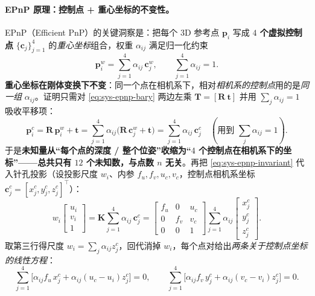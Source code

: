 \paragraph{EPnP 原理：控制点 + 重心坐标的不变性。}
EPnP（Efficient PnP）的关键洞察是：把每个 3D 参考点 $\mathbf{p}_i$ 写成 \textbf{$4$ 个虚拟控制点} $\{\mathbf{c}_j\}_{j=1}^4$ 的\emph{重心坐标}组合，权重 $\alpha_{ij}$ 满足归一化约束
\begin{equation}
\mathbf{p}_i^{w}=\sum_{j=1}^{4}\alpha_{ij}\,\mathbf{c}_j^{w},\qquad
\sum_{j=1}^{4}\alpha_{ij}=1 .
\label{eq:sys-epnp-bary}
\end{equation}
\textbf{重心坐标在刚体变换下不变}：同一个点在相机系下，相对\emph{相机系的控制点}用的是\emph{同一组} $\alpha_{ij}$。证明只需对 \cref{eq:sys-epnp-bary} 两边左乘 $\mathbf{T}=[\mathbf{R}\ \mathbf{t}]$ 并用 $\sum_j\alpha_{ij}=1$ 吸收平移项：
\begin{equation}
\mathbf{p}_i^{c}=\mathbf{R}\,\mathbf{p}_i^{w}+\mathbf{t}
=\sum_{j=1}^{4}\alpha_{ij}\big(\mathbf{R}\,\mathbf{c}_j^{w}+\mathbf{t}\big)
=\sum_{j=1}^{4}\alpha_{ij}\,\mathbf{c}_j^{c}
\quad(\text{用到 }\textstyle\sum_j\alpha_{ij}=1).
\label{eq:sys-epnp-invariant}
\end{equation}
于是\textbf{未知量从“每个点的深度 / 整个位姿”收缩为“$4$ 个控制点在相机系下的坐标”——总共只有 $12$ 个未知数，与点数 $n$ 无关}。再把 \cref{eq:sys-epnp-invariant} 代入针孔投影（设投影尺度 $w_i$、内参 $f_u,f_v,u_c,v_c$，控制点相机系坐标 $\mathbf{c}_j^c=[x_j^c,y_j^c,z_j^c]^\top$）：
\begin{equation}
w_i\begin{bmatrix}u_i\\ v_i\\ 1\end{bmatrix}
=\mathbf{K}\sum_{j=1}^{4}\alpha_{ij}\,\mathbf{c}_j^{c}
=\begin{bmatrix}f_u&0&u_c\\ 0&f_v&v_c\\ 0&0&1\end{bmatrix}
\sum_{j=1}^{4}\alpha_{ij}\begin{bmatrix}x_j^c\\ y_j^c\\ z_j^c\end{bmatrix}.
\label{eq:sys-epnp-proj}
\end{equation}
取第三行得尺度 $w_i=\sum_{j}\alpha_{ij}z_j^c$，回代消掉 $w_i$，每个点对给出\emph{两条关于控制点坐标的线性方程}：
\begin{equation}
\sum_{j=1}^{4}\!\big[\alpha_{ij}f_u\,x_j^c+\alpha_{ij}(u_c-u_i)z_j^c\big]=0,\qquad
\sum_{j=1}^{4}\!\big[\alpha_{ij}f_v\,y_j^c+\alpha_{ij}(v_c-v_i)z_j^c\big]=0 .
\label{eq:sys-epnp-linear}
\end{equation}
